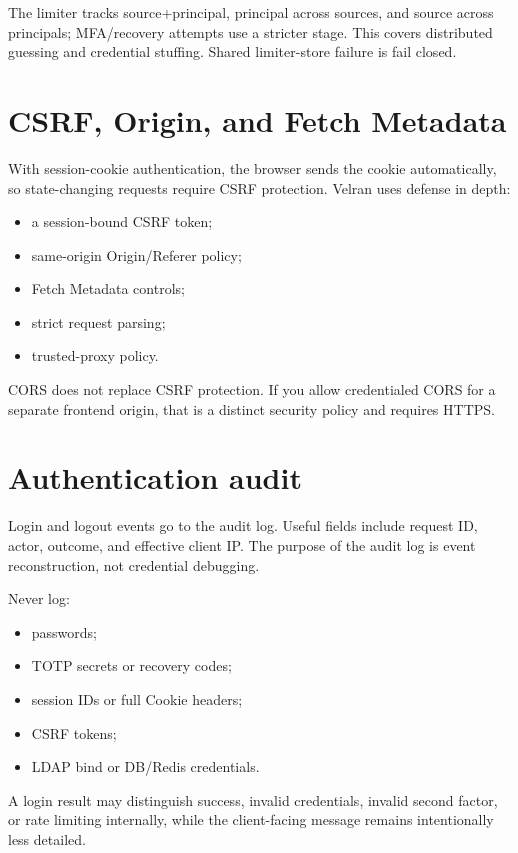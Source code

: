 The limiter tracks source+principal, principal across sources, and source across principals; MFA/recovery attempts use a stricter stage. This covers distributed guessing and credential stuffing. Shared limiter-store failure is fail closed.

\section{CSRF, Origin, and Fetch Metadata}

With session-cookie authentication, the browser sends the cookie automatically, so state-changing requests require CSRF protection. Velran uses defense in depth:

\begin{itemize}
  \item a session-bound CSRF token;
  \item same-origin Origin/Referer policy;
  \item Fetch Metadata controls;
  \item strict request parsing;
  \item trusted-proxy policy.
\end{itemize}

CORS does not replace CSRF protection. If you allow credentialed CORS for a separate frontend origin, that is a distinct security policy and requires HTTPS.

\section{Authentication audit}

Login and logout events go to the audit log. Useful fields include request ID, actor, outcome, and effective client IP. The purpose of the audit log is event reconstruction, not credential debugging.

Never log:

\begin{itemize}
  \item passwords;
  \item TOTP secrets or recovery codes;
  \item session IDs or full Cookie headers;
  \item CSRF tokens;
  \item LDAP bind or DB/Redis credentials.
\end{itemize}

A login result may distinguish success, invalid credentials, invalid second factor, or rate limiting internally, while the client-facing message remains intentionally less detailed.

